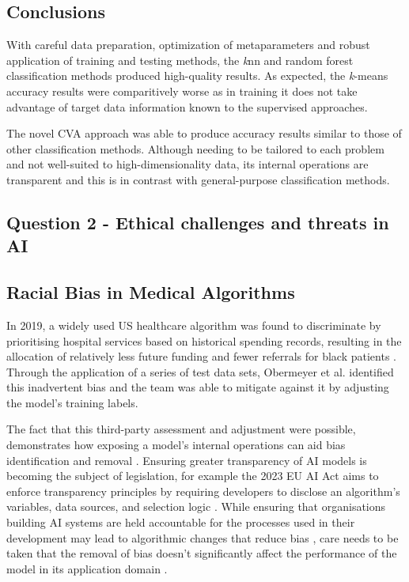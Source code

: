 \documentclass[a4paper, 11pt]{article}
\begin{document}
\subsection*{Conclusions}

With careful data preparation, optimization of metaparameters and robust application of training and testing methods, 
the \textit{k}nn and random forest classification methods produced high-quality results. 
As expected, the \textit{k}-means accuracy results were comparitively worse
as in training it does not take advantage of target data information known to the supervised approaches. 

The novel CVA approach was able to produce accuracy results
similar to those of other classification methods. 
Although needing to be tailored to each problem and not well-suited to high-dimensionality data, 
its internal operations are transparent and this is in contrast with general-purpose classification methods. 


\begin{center}
\subsection*{Question 2 - Ethical challenges and threats in AI}
\end{center}

\subsection*{Racial Bias in Medical Algorithms}

In 2019, a widely used US healthcare algorithm was found to discriminate by prioritising hospital services based on historical spending records, resulting in the allocation of relatively less future funding and fewer referrals for black patients \cite{Jemielity2019, Ledford2019}. Through the application of a series of test data sets, Obermeyer et al. \cite{Obermeyer2019} identified this inadvertent bias and the team was able to mitigate against it by adjusting the model’s training labels. 

The fact that this third-party assessment and adjustment were possible, demonstrates how exposing a model’s internal operations can aid bias identification and removal \cite{Seroussi2020, Winter2023}. Ensuring greater transparency of AI models is becoming the subject of legislation, for example the 2023 EU AI Act aims to enforce transparency principles by requiring developers to disclose an algorithm’s variables, data sources, and selection logic \cite{EuropeanParliament2023, Edwards2021}. While ensuring that organisations building AI systems are held accountable for the processes used in their development may lead to algorithmic changes that reduce bias \cite{Donovan2018, Lawry2020}, care needs to be taken that the removal of bias doesn't significantly affect the performance of the model in its application domain \cite{Kearns2020}.
\end{document}
